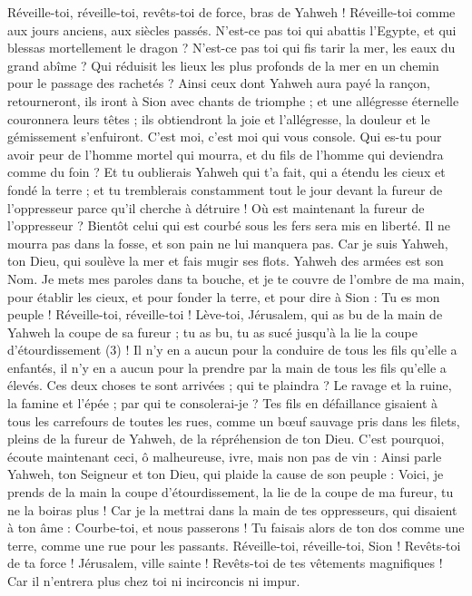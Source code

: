 \begin{multicols}{2}
{Réveille-toi, réveille-toi, revêts-toi de force, bras de Yahweh ! Réveille-toi comme aux jours anciens, aux siècles passés. N'est-ce pas toi qui abattis l’Egypte, et qui blessas mortellement le dragon ?
N'est-ce pas toi qui fis tarir la mer, les eaux du grand abîme ? Qui réduisit les lieux les plus profonds de la mer en un chemin pour le passage des rachetés ?
Ainsi ceux dont Yahweh aura payé la rançon, retourneront, ils iront à Sion avec chants de triomphe ; et une allégresse éternelle couronnera leurs têtes ; ils obtiendront la joie et l'allégresse, la douleur et le gémissement s'enfuiront.
C'est moi, c'est moi qui vous console. Qui es-tu pour avoir peur de l'homme mortel qui mourra, et du fils de l'homme qui deviendra comme du foin ?
Et tu oublierais Yahweh qui t'a fait, qui a étendu les cieux et fondé la terre ; et tu tremblerais constamment tout le jour devant la fureur de l’oppresseur parce qu’il cherche à détruire ! Où est maintenant la fureur de l’oppresseur ?
Bientôt celui qui est courbé sous les fers sera mis en liberté. Il ne mourra pas dans la fosse, et son pain ne lui manquera pas.
Car je suis Yahweh, ton Dieu, qui soulève la mer et fais mugir ses flots. Yahweh des armées est son Nom.
Je mets mes paroles dans ta bouche, et je te couvre de l'ombre de ma main, pour établir les cieux, et pour fonder la terre, et pour dire à Sion : Tu es mon peuple !
Réveille-toi, réveille-toi ! Lève-toi, Jérusalem, qui as bu de la main de Yahweh la coupe de sa fureur ; tu as bu, tu as sucé jusqu’à la lie la coupe d'étourdissement (3) !
Il n'y en a aucun pour la conduire de tous les fils qu'elle a enfantés, il n’y en a aucun pour la prendre par la main de tous les fils qu’elle a élevés.
Ces deux choses te sont arrivées ; qui te plaindra ? Le ravage et la ruine, la famine et l'épée ; par qui te consolerai-je ?
Tes fils en défaillance gisaient à tous les carrefours de toutes les rues, comme un bœuf sauvage pris dans les filets, pleins de la fureur de Yahweh, de la répréhension de ton Dieu.
C'est pourquoi, écoute maintenant ceci, ô malheureuse, ivre, mais non pas de vin :
Ainsi parle Yahweh, ton Seigneur et ton Dieu, qui plaide la cause de son peuple : Voici, je prends de la main la coupe d'étourdissement, la lie de la coupe de ma fureur, tu ne la boiras plus !
Car je la mettrai dans la main de tes oppresseurs, qui disaient à ton âme : Courbe-toi, et nous passerons ! Tu faisais alors de ton dos comme une terre, comme une rue pour les passants.
\VerseOne{}Réveille-toi, réveille-toi, Sion ! Revêts-toi de ta force ! Jérusalem, ville sainte ! Revêts-toi de tes vêtements magnifiques ! Car il n’entrera plus chez toi ni incirconcis ni impur.
}
\end{multicols}
